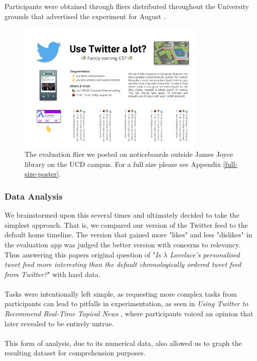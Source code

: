 \documentclass{article}
\begin{document}
\\\\
Participants were obtained through fliers distributed throughout the University grounds that advertised the experiment for August . 




\begin{figure}[H]
    \centering
    \includegraphics[width=0.8\textwidth]{evaluation_poster}
    \caption{The evaluation flier we posted on noticeboards outside James Joyce library on the UCD campus. For a full size please see Appendix \ref{full-size-poster}.}
\end{figure}




\subsubsection*{Data Analysis} 





We brainstormed upon this several times and ultimately decided to take the simplest approach. That is, we compared our version of the Twitter feed to the default home timeline. The version that gained more "likes" and less "dislikes" in the evaluation app was judged the better version with concerns to relevancy. Thus answering this papers original question of "\textit{Is $\lambda$ Lovelace's personalised tweet feed more interesting than the default chronologically ordered tweet feed from Twitter?}" with hard data.
\\\\



Tasks were intentionally left simple, as requesting more complex tasks from participants can lead to pitfalls in experimentation, as seen in \textit{Using Twitter to Recommend Real-Time Topical News} \cite{paper3}, where participants voiced an opinion that later revealed to be entirely untrue.
\\\\
This form of analysis, due to its numerical data, also allowed us to graph the resulting dataset for comprehension purposes. 
\end{document}
